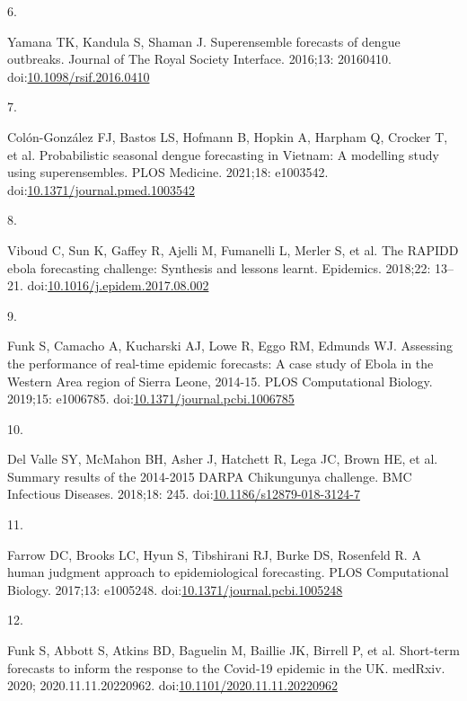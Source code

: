 \documentclass[10pt,letterpaper]{article}
\newlength{\cslhangindent}
\newlength{\csllabelwidth}
\newlength{\cslentryspacingunit} %
\newenvironment{CSLReferences}[2] %
 {%
  \setlength{\parindent}{0pt}
  \ifodd #1
  \let\oldpar\par
  \def\par{\hangindent=\cslhangindent\oldpar}
  \fi
  \setlength{\parskip}{#2\cslentryspacingunit}
 }%
 {}
\newcommand{\CSLLeftMargin}[1]{\parbox[t]{\csllabelwidth}{#1}}
\newcommand{\CSLRightInline}[1]{\parbox[t]{\linewidth - \csllabelwidth}{#1}\break}
\begin{document}
\begin{CSLReferences}{0}{0}
\leavevmode{}%
\CSLLeftMargin{6. }%
\CSLRightInline{Yamana TK, Kandula S, Shaman J. Superensemble forecasts
of dengue outbreaks. Journal of The Royal Society Interface. 2016;13:
20160410.
doi:\href{https://doi.org/10.1098/rsif.2016.0410}{10.1098/rsif.2016.0410}}

\leavevmode{}%
\CSLLeftMargin{7. }%
\CSLRightInline{Colón-González FJ, Bastos LS, Hofmann B, Hopkin A,
Harpham Q, Crocker T, et al. Probabilistic seasonal dengue forecasting
in {Vietnam}: {A} modelling study using superensembles. PLOS Medicine.
2021;18: e1003542.
doi:\href{https://doi.org/10.1371/journal.pmed.1003542}{10.1371/journal.pmed.1003542}}

\leavevmode{}%
\CSLLeftMargin{8. }%
\CSLRightInline{Viboud C, Sun K, Gaffey R, Ajelli M, Fumanelli L, Merler
S, et al. The {RAPIDD} ebola forecasting challenge: {Synthesis} and
lessons learnt. Epidemics. 2018;22: 13--21.
doi:\href{https://doi.org/10.1016/j.epidem.2017.08.002}{10.1016/j.epidem.2017.08.002}}

\leavevmode{}%
\CSLLeftMargin{9. }%
\CSLRightInline{Funk S, Camacho A, Kucharski AJ, Lowe R, Eggo RM,
Edmunds WJ. Assessing the performance of real-time epidemic forecasts:
{A} case study of {Ebola} in the {Western Area} region of {Sierra
Leone}, 2014-15. PLOS Computational Biology. 2019;15: e1006785.
doi:\href{https://doi.org/10.1371/journal.pcbi.1006785}{10.1371/journal.pcbi.1006785}}

\leavevmode{}%
\CSLLeftMargin{10. }%
\CSLRightInline{Del Valle SY, McMahon BH, Asher J, Hatchett R, Lega JC,
Brown HE, et al. Summary results of the 2014-2015 {DARPA Chikungunya}
challenge. BMC Infectious Diseases. 2018;18: 245.
doi:\href{https://doi.org/10.1186/s12879-018-3124-7}{10.1186/s12879-018-3124-7}}

\leavevmode{}%
\CSLLeftMargin{11. }%
\CSLRightInline{Farrow DC, Brooks LC, Hyun S, Tibshirani RJ, Burke DS,
Rosenfeld R. A human judgment approach to epidemiological forecasting.
PLOS Computational Biology. 2017;13: e1005248.
doi:\href{https://doi.org/10.1371/journal.pcbi.1005248}{10.1371/journal.pcbi.1005248}}

\leavevmode{}%
\CSLLeftMargin{12. }%
\CSLRightInline{Funk S, Abbott S, Atkins BD, Baguelin M, Baillie JK,
Birrell P, et al. Short-term forecasts to inform the response to the
{Covid-19} epidemic in the {UK}. medRxiv. 2020; 2020.11.11.20220962.
doi:\href{https://doi.org/10.1101/2020.11.11.20220962}{10.1101/2020.11.11.20220962}}


\end{CSLReferences}
\end{document}
